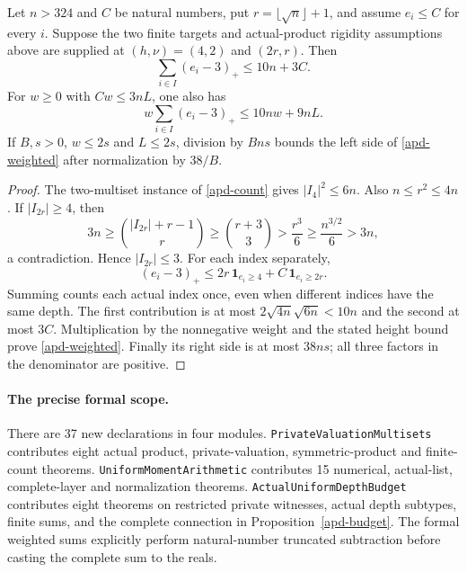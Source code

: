 \begin{proposition}\label{apd-budget}
Let $n>324$ and $C$ be natural numbers, put $r=\lfloor\sqrt n\rfloor+1$,
and assume $e_i\le C$ for every $i$. Suppose the two finite targets
and actual-product rigidity assumptions above are supplied at
$(h,\nu)=(4,2)$ and $(2r,r)$. Then
\begin{equation}\label{apd-excess}
 \sum_{i\in I}(e_i-3)_+\le10n+3C.
\end{equation}
For $w\ge0$ with $Cw\le3nL$, one also has
\begin{equation}\label{apd-weighted}
 w\sum_{i\in I}(e_i-3)_+\le10nw+9nL.
\end{equation}
If $B,s>0$, $w\le2s$ and $L\le2s$, division by $Bns$ bounds
the left side of \eqref{apd-weighted} after normalization by $38/B$.
\end{proposition}
\begin{proof}
The two-multiset instance of \eqref{apd-count} gives $|I_4|^2\le6n$.
Also $n\le r^2\le4n$. If $|I_{2r}|\ge4$, then
\[
 3n\ge\binom{|I_{2r}|+r-1}{r}
 \ge\binom{r+3}{3}>\frac{r^3}{6}\ge\frac{n^{3/2}}6>3n,
\]
a contradiction. Hence $|I_{2r}|\le3$. For each index separately,
\[
 (e_i-3)_+\le 2r\,\mathbf1_{e_i\ge4}
                  +C\,\mathbf1_{e_i\ge2r}.
\]
Summing counts each actual index once, even when different indices
have the same depth. The first contribution is at most
$2\sqrt{4n}\sqrt{6n}<10n$ and the second at most $3C$.
Multiplication by the nonnegative weight and the stated height bound
prove \eqref{apd-weighted}. Finally its right side is at most $38ns$;
all three factors in the denominator are positive.
\end{proof}

\paragraph{The precise formal scope.}
There are 37 new declarations in four modules.
\texttt{PrivateValuation\allowbreak Multisets} contributes eight actual
product, private-valuation, symmetric-product and finite-count theorems.
\texttt{UniformMoment\allowbreak Arithmetic} contributes 15 numerical,
actual-list, complete-layer and normalization theorems.
\texttt{ActualUniform\allowbreak DepthBudget} contributes eight theorems
on restricted private witnesses, actual depth subtypes, finite sums,
and the complete connection in Proposition~\ref{apd-budget}.
The formal weighted sums explicitly perform natural-number truncated
subtraction before casting the complete sum to the reals.

